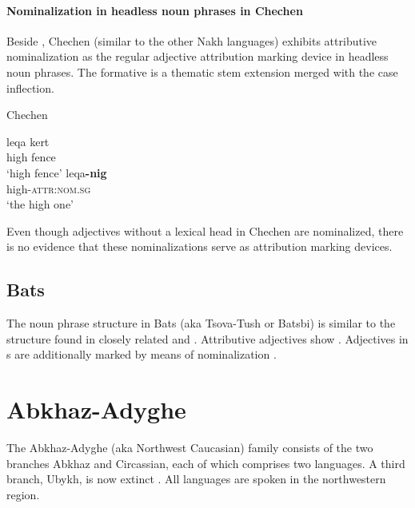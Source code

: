 \paragraph*{Nominalization in headless noun phrases in Chechen}
Beside , Chechen (similar to the other Nakh languages) exhibits attributive nominalization as the regular adjective attribution marking device in headless noun phrases. The formative is a thematic stem extension merged with the case inflection.
\begin{exe}
\ex \rm{Chechen \citep[29]{nichols1994a}}
\begin{xlist}
\ex
\gll	leqa kert\\
	high fence\\
\glt	‘high fence’
\ex	
\gll	leqa\textbf{-nig}\\
	high-\textsc{attr:nom.sg}\\
\glt	‘the high one’
\end{xlist}
\end{exe}
Even though adjectives without a lexical head in Chechen are nominalized, there is no evidence that these nominalizations serve as attribution marking devices.

\subsection{Bats}
The noun phrase structure in Bats (aka Tsova-Tush or Batsbi) is similar to the structure found in closely related  and . Attributive adjectives show . Adjectives in s are additionally marked by means of nominalization \citep[172–172]{holisky-etal1994}.

\section{Abkhaz-Adyghe}
The Abkhaz-Adyghe (aka Northwest Caucasian) family consists of the two branches Abkhaz and Circassian, each of which comprises two languages. A third branch, Ubykh, is now extinct \citep[220, 233]{salminen2007}. All languages are spoken in the northwestern  region.

